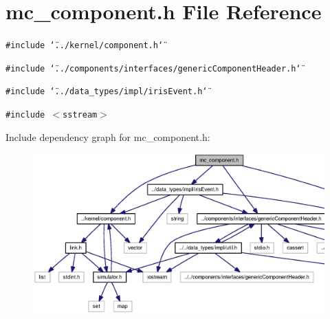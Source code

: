 \section{mc\_\-component.h File Reference}
\label{mc__component_8h}
{\tt \#include \char`\"{}../kernel/component.h\char`\"{}}\par
{\tt \#include \char`\"{}../components/interfaces/genericComponentHeader.h\char`\"{}}\par
{\tt \#include \char`\"{}../data\_\-types/impl/irisEvent.h\char`\"{}}\par
{\tt \#include $<$sstream$>$}\par


Include dependency graph for mc\_\-component.h:\nopagebreak
\begin{figure}[H]
\begin{center}
\leavevmode
\includegraphics[width=413pt]{mc__component_8h__incl}
\end{center}
\end{figure}


